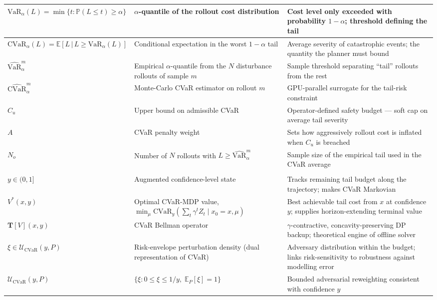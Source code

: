 \documentclass[letterpaper, 10 pt, conference]{ieeeconf}  %
\begin{document}
\begin{longtable}{|>{\raggedright\arraybackslash}p{}|>{\raggedright\arraybackslash}p{}|>{\raggedright\arraybackslash}p{}|}
\hline
$\mathrm{VaR}_\alpha(L)\!=\!\min\{t:\mathbb{P}(L\!\le\!t)\!\ge\!\alpha\}$ & $\alpha$-quantile of the rollout cost distribution & Cost level only exceeded with probability $1\!-\!\alpha$; threshold defining the tail \\
\hline
$\mathrm{CVaR}_\alpha(L)\!=\!\mathbb{E}[L\,|\,L\!\ge\!\mathrm{VaR}_\alpha(L)]$ & Conditional expectation in the worst $1\!-\!\alpha$ tail & Average severity of catastrophic events; the quantity the planner must bound \\
\hline
$\widehat{\mathrm{VaR}}_\alpha^{m}$ & Empirical $\alpha$-quantile from the $N$ disturbance rollouts of sample $m$ & Sample threshold separating ``tail'' rollouts from the rest \\
\hline
$\widehat{\mathrm{CVaR}}_\alpha^{m}$ & Monte-Carlo CVaR estimator on rollout $m$ & GPU-parallel surrogate for the tail-risk constraint \\
\hline
$C_u$ & Upper bound on admissible CVaR & Operator-defined safety budget --- soft cap on average tail severity \\
\hline
$A$ & CVaR penalty weight & Sets how aggressively rollout cost is inflated when $C_u$ is breached \\
\hline
$N_o$ & Number of $N$ rollouts with $L\!\ge\!\widehat{\mathrm{VaR}}_\alpha^{m}$ & Sample size of the empirical tail used in the CVaR average \\
\hline
\multicolumn{3}{|l|}{\textit{Offline dynamic-programming quantities (Chow et al.~2015)}} \\
\hline
$y\!\in\!(0,1]$ & Augmented confidence-level state & Tracks remaining tail budget along the trajectory; makes CVaR Markovian \\
\hline
$V^{*}(x,y)$ & Optimal CVaR-MDP value, $\min_\mu\mathrm{CVaR}_y(\sum_t\gamma^{t}Z_t\!\mid\!x_0\!=\!x,\mu)$ & Best achievable tail cost from $x$ at confidence $y$; supplies horizon-extending terminal value \\
\hline
$\mathbf{T}[V](x,y)$ & CVaR Bellman operator & $\gamma$-contractive, concavity-preserving DP backup; theoretical engine of offline solver \\
\hline
$\xi\!\in\!\mathcal{U}_{\mathrm{CVaR}}(y,P)$ & Risk-envelope perturbation density (dual representation of CVaR) & Adversary distribution within the budget; links risk-sensitivity to robustness against modelling error \\
\hline
$\mathcal{U}_{\mathrm{CVaR}}(y,P)$ & $\{\xi:0\!\le\!\xi\!\le\!1/y,\;\mathbb{E}_P[\xi]\!=\!1\}$ & Bounded adversarial reweighting consistent with confidence $y$ \\

\end{longtable}
\end{document}

